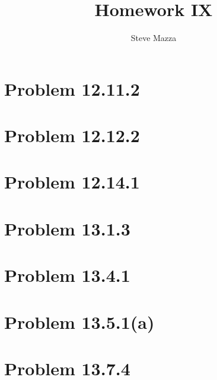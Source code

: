 \documentclass[letterpaper,10pt]{article}
\title{Homework IX}
\author{Steve Mazza}
\begin{document}
\maketitle

\section*{Problem 12.11.2}

\section*{Problem 12.12.2}

\section*{Problem 12.14.1}

\section*{Problem 13.1.3}

\section*{Problem 13.4.1}

\section*{Problem 13.5.1(a)}

\section*{Problem 13.7.4}
\end{document}
